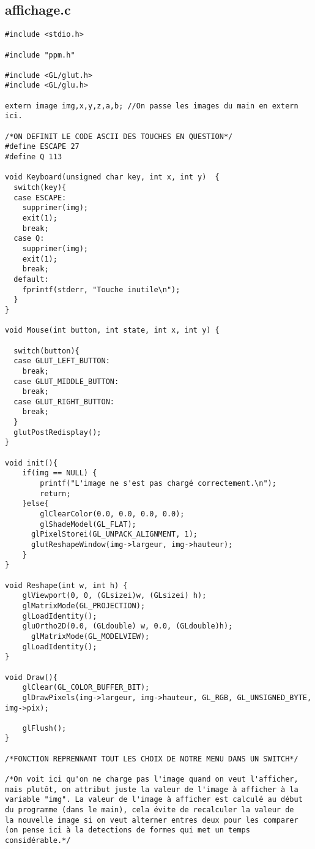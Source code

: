 \documentclass[a4paper , 10pt]{article}
\begin{document}
\subsection{affichage.c}
\begin{verbatim}
#include <stdio.h>
	
#include "ppm.h"

#include <GL/glut.h>
#include <GL/glu.h>

extern image img,x,y,z,a,b; //On passe les images du main en extern ici.

/*ON DEFINIT LE CODE ASCII DES TOUCHES EN QUESTION*/
#define ESCAPE 27
#define Q 113

void Keyboard(unsigned char key, int x, int y)  {
  switch(key){
  case ESCAPE:
    supprimer(img);
    exit(1);                 
    break;
  case Q:
    supprimer(img);
    exit(1);                 
    break;
  default:
    fprintf(stderr, "Touche inutile\n");
  }
}

void Mouse(int button, int state, int x, int y) {

  switch(button){
  case GLUT_LEFT_BUTTON:
    break;
  case GLUT_MIDDLE_BUTTON:
    break;
  case GLUT_RIGHT_BUTTON:
    break;    
  }
  glutPostRedisplay();
}

void init(){
	if(img == NULL) {
    	printf("L'image ne s'est pas chargé correctement.\n");
    	return;
  	}else{
  		glClearColor(0.0, 0.0, 0.0, 0.0);
  		glShadeModel(GL_FLAT);
      glPixelStorei(GL_UNPACK_ALIGNMENT, 1);
      glutReshapeWindow(img->largeur, img->hauteur);
  	}
}

void Reshape(int w, int h) {
  	glViewport(0, 0, (GLsizei)w, (GLsizei) h);
  	glMatrixMode(GL_PROJECTION);
  	glLoadIdentity();  
  	gluOrtho2D(0.0, (GLdouble) w, 0.0, (GLdouble)h);
 	  glMatrixMode(GL_MODELVIEW);
  	glLoadIdentity();
}

void Draw(){
  	glClear(GL_COLOR_BUFFER_BIT);
    glDrawPixels(img->largeur, img->hauteur, GL_RGB, GL_UNSIGNED_BYTE, img->pix);

    glFlush();
}

/*FONCTION REPRENNANT TOUT LES CHOIX DE NOTRE MENU DANS UN SWITCH*/

/*On voit ici qu'on ne charge pas l'image quand on veut l'afficher,
mais plutôt, on attribut juste la valeur de l'image à afficher à la
variable "img". La valeur de l'image à afficher est calculé au début
du programme (dans le main), cela évite de recalculer la valeur de 
la nouvelle image si on veut alterner entres deux pour les comparer
(on pense ici à la detections de formes qui met un temps considérable.*/


\end{verbatim}
\end{document}
